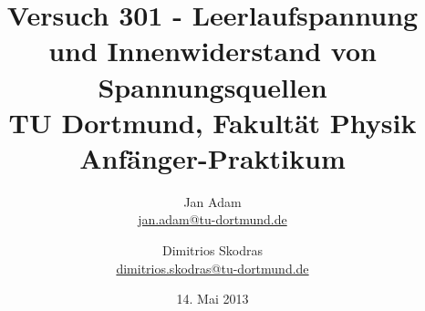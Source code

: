 



\title{Versuch 301 - Leerlaufspannung und Innenwiderstand von Spannungsquellen\\				%
\large TU Dortmund, Fakultät Physik\\ 
\normalsize Anfänger-Praktikum}

\author{Jan Adam\\			%
{\small \href{jan.adam@tu-dortmund.de}{jan.adam@tu-dortmund.de}}	%
\and						%
Dimitrios Skodras\\					%
{\small \href{dimitrios.skodras@tu-dortmund.de}{dimitrios.skodras@tu-dortmund.de}}		%
}
\date{14. Mai 2013}				%





\maketitle					%
\thispagestyle{empty} 				%



\tableofcontents


\newpage					%



